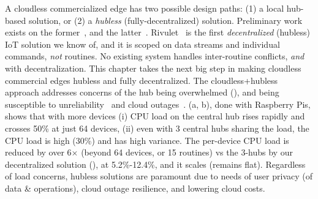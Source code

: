 A cloudless commercialized edge has two possible design paths:
(1) a local hub-based solution, or (2) a {\it hubless} (fully-decentralized)  solution. Preliminary work exists on the former~\cite{HACloudless}, and the latter~\cite{rivulet}.
Rivulet~\cite{rivulet} is the first {\it decentralized} (hubless) IoT solution we know
of, and it is scoped on data streams and individual commands,
\textit{not} routines.
No existing system
handles inter-routine conflicts, \textit{and} with decentralization.
This chapter takes the next big step in making cloudless commercial edges hubless and fully decentralized. The cloudless+hubless approach addresses concerns of the hub being overwhelmed
(), and being susceptible to unreliability~\cite{moore2020iot} and cloud outages~\cite{gcloud-down1}.
%
(a, b), done with Raspberry Pis, shows that with more devices (i) CPU load on the {central hub} rises rapidly and crosses 50\% at just 64 devices, (ii) even with 3 central hubs sharing the load, the CPU load is high (30\%) and has high variance. The per-device CPU load is reduced by over 6$\times$ (beyond 64 devices, or 15 routines) vs the 3-hubs by our decentralized solution (\sysname), at 5.2\%-12.4\%, and it scales (remains flat). Regardless of load concerns, hubless solutions are paramount due to needs of user privacy (of data \& operations), cloud outage resilience, and lowering cloud costs.


\renewcommand{\arraystretch}{1.2}

